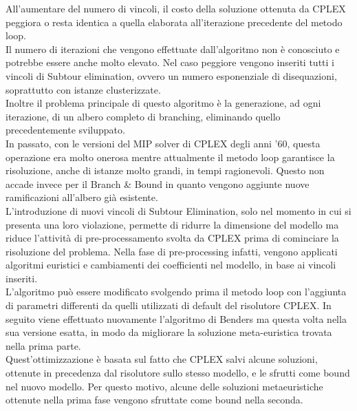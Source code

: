 All'aumentare del numero di vincoli, il costo della soluzione ottenuta da CPLEX peggiora o resta identica a quella elaborata all'iterazione precedente del metodo loop.\\
Il numero di iterazioni che vengono effettuate dall'algoritmo non è conosciuto e potrebbe essere anche molto elevato. Nel caso peggiore vengono inseriti tutti i vincoli di Subtour elimination, ovvero un numero esponenziale di disequazioni, soprattutto con istanze clusterizzate.\\
Inoltre il problema principale di questo algoritmo è la generazione, ad ogni iterazione, di un albero completo di branching, eliminando quello precedentemente sviluppato.\\
In passato, con le versioni del MIP solver di CPLEX degli anni '60, questa operazione era molto onerosa mentre attualmente il metodo loop garantisce la risoluzione, anche di istanze molto grandi, in tempi ragionevoli.
Questo non accade invece per il Branch \& Bound in quanto vengono aggiunte nuove ramificazioni all'albero già esistente.\\
L'introduzione di nuovi vincoli di Subtour Elimination, solo nel momento in cui si presenta una loro violazione, permette di ridurre la dimensione del modello ma riduce l'attività di pre-processamento svolta da CPLEX prima di cominciare la risoluzione del problema. Nella fase di pre-processing infatti, vengono applicati algoritmi euristici e cambiamenti dei coefficienti nel modello, in base ai vincoli inseriti.\\
L'algoritmo può essere modificato svolgendo prima il metodo loop con l'aggiunta di parametri differenti da quelli utilizzati di default del risolutore CPLEX. In seguito viene effettuato nuovamente l'algoritmo di Benders ma questa volta nella sua versione esatta, in modo da migliorare la soluzione meta-euristica trovata nella prima parte. \\
Quest'ottimizzazione è basata sul fatto che CPLEX salvi alcune soluzioni, ottenute in precedenza dal risolutore sullo stesso modello, e le sfrutti come bound nel nuovo modello. Per questo motivo, alcune delle soluzioni metaeuristiche ottenute nella prima fase vengono sfruttate come bound nella seconda.

